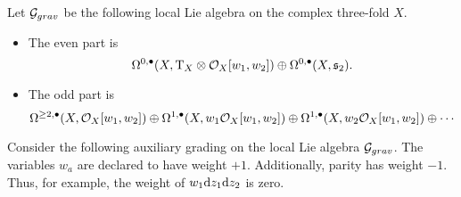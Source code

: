 \documentclass[11pt]{amsart}
\begin{document}
\begin{dfn}
Let $\mathcal G_{grav}$ be the following local Lie algebra on the complex three-fold $X$. 
\begin{itemize}
\item The even part is 
\[
\Omega^{0,\bullet}(X , {\rm T}_X \otimes \mathcal O_X [w_1,w_2]) \oplus \Omega^{0,\bullet}(X , \mathfrak{s}_2) .
\]
\item The odd part is 
\[
\Omega^{\geq 2, \bullet}(X, \mathcal O_X[w_1,w_2]) \oplus \Omega^{1,\bullet}(X, w_1 \mathcal O_X[w_1,w_2]) \oplus \Omega^{1,\bullet}(X, w_2 \mathcal O_X[w_1,w_2]) \oplus \cdots
\]
\end{itemize} 
\end{dfn}

\parsec

Consider the following auxiliary grading on the local Lie algebra $\mathcal G_{grav}$. 
The variables $w_a$ are declared to have weight $+1$. 
Additionally, parity has weight $-1$.
Thus, for example, the weight of $w_1 {\rm d} z_1 {\rm d} z_2$ is zero.
\end{document}
